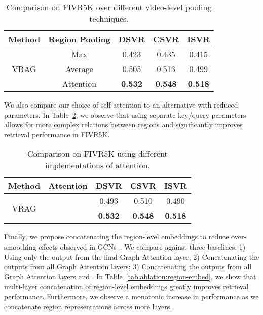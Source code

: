 \documentclass[letterpaper]{article} \usepackage{aaai22}  \usepackage{times}  \usepackage{helvet}  \usepackage{courier}  \usepackage[hyphens]{url}  \usepackage{graphicx} \urlstyle{rm} \usepackage{amsmath}
\begin{document}
\begin{table}[ht]
    \centering
    \begin{tabular}{|c|c|c|c|c|}
    \hline
         Method & Region Pooling & DSVR & CSVR & ISVR \\
         \hline\hline
         \multirow{3}{*}{VRAG} & Max & 0.423 & 0.435 & 0.415 \\
        \cline{2-5}
          & Average & 0.505 & 0.513 & 0.499 \\
         \cline{2-5}
          &  Attention & \textbf{0.532} & \textbf{0.548} & \textbf{0.518} \\
         \hline
    \end{tabular}
    \caption{\label{tab:ablation:region-pooling} {Comparison on FIVR5K over different video-level pooling techniques.}}
\end{table}
We also compare our choice of self-attention to an alternative with reduced parameters. In Table~\ref{tab:ablation:attention}, we observe that using separate key/query parameters allows for more complex relations between regions and significantly improves retrieval performance in FIVR5K.
\begin{table}[ht]
    \centering
    \begin{tabular}{|c|c|c|c|c|}
    \hline
         Method & Attention & DSVR & CSVR & ISVR \\
         \hline\hline
         \multirow{2}{*}{VRAG} &  & 0.493 & 0.510 & 0.490 \\
         \cline{2-5}
          &   & \textbf{0.532} & \textbf{0.548} & \textbf{0.518} \\
         \hline
    \end{tabular}
    \caption{Comparison on FIVR5K using different implementations of attention.}
    \label{tab:ablation:attention}
\end{table}

Finally, we propose concatenating the region-level embeddings to reduce over-smoothing effects observed in GCNs~\cite{gcn:over-smoothing1, chen2019measuring}. We compare against three baselines: 1) Using only the output from the final Graph Attention layer; 2) Concatenating the outputs from all Graph Attention layers; 3) Concatenating the outputs from all Graph Attention layers and . In Table~\ref{tab:ablation:region-embed}, we show that  multi-layer concatenation of region-level embeddings greatly improves retrieval performance. Furthermore, we observe a monotonic increase in performance as we concatenate  region representations across more layers.
\end{document}
